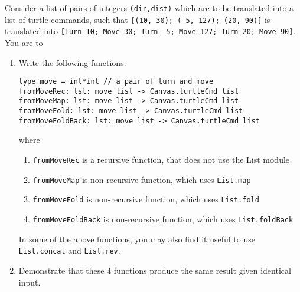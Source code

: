 Consider a list of pairs of integers \lstinline{(dir,dist)} which are to be translated into a list of turtle commands, such that \lstinline{[(10, 30); (-5, 127); (20, 90)]} is translated into \lstinline{[Turn 10; Move 30; Turn -5; Move 127; Turn 20; Move 90]}. You are to
\begin{enumerate}
\item
  Write the following functions:
\begin{lstlisting}
type move = int*int // a pair of turn and move
fromMoveRec: lst: move list -> Canvas.turtleCmd list
fromMoveMap: lst: move list -> Canvas.turtleCmd list
fromMoveFold: lst: move list -> Canvas.turtleCmd list
fromMoveFoldBack: lst: move list -> Canvas.turtleCmd list     
\end{lstlisting}
where
\begin{enumerate}
\item \lstinline{fromMoveRec} is a recursive function, that does not use the List module
\item \lstinline{fromMoveMap} is non-recursive function, which uses \lstinline{List.map}
\item \lstinline{fromMoveFold} is non-recursive function, which uses \lstinline{List.fold} 
\item \lstinline{fromMoveFoldBack} is non-recursive function, which uses \lstinline{List.foldBack} 
\end{enumerate}
In some of the above functions, you may also find it useful to use \lstinline{List.concat} and \lstinline{List.rev}.
\item Demonstrate that these 4 functions produce the same result given identical input.
\end{enumerate}

